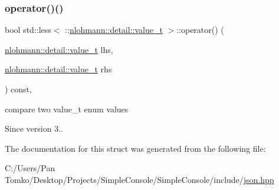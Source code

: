 \subsubsection{\texorpdfstring{operator()()}{operator()()}}
{\footnotesize\ttfamily bool std\+::less$<$ \+::\mbox{\hyperlink{namespacenlohmann_1_1detail_a1ed8fc6239da25abcaf681d30ace4985}{nlohmann\+::detail\+::value\+\_\+t}} $>$\+::operator() (\begin{DoxyParamCaption}\item[{\mbox{\hyperlink{namespacenlohmann_1_1detail_a1ed8fc6239da25abcaf681d30ace4985}{nlohmann\+::detail\+::value\+\_\+t}}}]{lhs,  }\item[{\mbox{\hyperlink{namespacenlohmann_1_1detail_a1ed8fc6239da25abcaf681d30ace4985}{nlohmann\+::detail\+::value\+\_\+t}}}]{rhs }\end{DoxyParamCaption}) const\hspace{0.3cm}{\ttfamily [inline]}, {\ttfamily [noexcept]}}



compare two value\+\_\+t enum values 

\begin{DoxySince}{Since}
version 3.. 
\end{DoxySince}


The documentation for this struct was generated from the following file\+:\begin{DoxyCompactItemize}
\item 
C\+:/\+Users/\+Pan Tomko/\+Desktop/\+Projects/\+Simple\+Console/\+Simple\+Console/include/\mbox{\hyperlink{json_8hpp}{json.\+hpp}}\end{DoxyCompactItemize}
